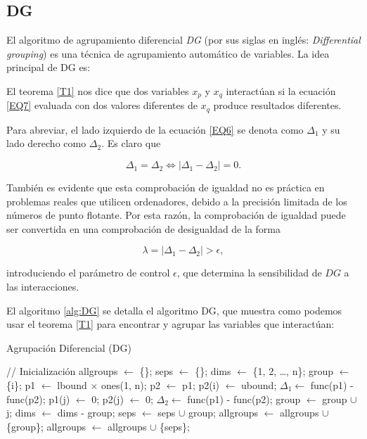 \subsection{DG}
El algoritmo de agrupamiento diferencial \textit{DG} (por sus siglas en inglés: \textit{Differential grouping}) es una técnica de agrupamiento automático de variables. La idea principal de DG es:

El teorema \ref{T1} nos dice que dos variables \(x_p\) y \(x_q\) interactúan si la ecuación \ref{EQ7} evaluada con dos valores diferentes de \(x_q\) produce resultados diferentes.

Para abreviar, el lado izquierdo de la ecuación \ref{EQ6} se denota como \(\Delta_1\) y su lado derecho como \(\Delta_2\). Es claro que 

\[
\Delta_1 = \Delta_2 \iff |\Delta_1 - \Delta_2| = 0.
\]

También es evidente que esta comprobación de igualdad no es práctica en problemas reales que utilicen ordenadores, debido a la precisión limitada de los números de punto flotante. Por esta razón, la comprobación de igualdad puede ser convertida en una comprobación de desigualdad de la forma 

\[
\lambda = |\Delta_1 - \Delta_2| > \epsilon,
\]

introduciendo el parámetro de control \(\epsilon\), que determina la sensibilidad de \(DG\) a las interacciones. 

El algoritmo \ref{alg:DG} se detalla el algoritmo DG, que muestra como podemos usar el teorema \ref{T1} para encontrar y agrupar las variables que interactúan:

\begin{algorithm}
\caption{Agrupación Diferencial (DG)}
\label{alg:DG}
\begin{algorithmic}[1]
\STATE // Inicialización
\STATE allgroups $\gets$ \{\};
\STATE seps $\gets$ \{\};
\STATE dims $\gets$ \{1, 2, \dots, n\};
    \STATE group $\gets$ \{i\};
        \STATE p1 $\gets$ lbound $\times$ ones(1, n);
        \STATE p2 $\gets$ p1;
        \STATE p2(i) $\gets$ ubound;
        \STATE $\Delta_1 \gets$ func(p1) - func(p2);
        \STATE p1(j) $\gets$ 0;
        \STATE p2(j) $\gets$ 0;
        \STATE $\Delta_2 \gets$ func(p1) - func(p2);
            \STATE group $\gets$ group $\cup$ j;
        \ENDIF
    \ENDFOR
    \STATE dims $\gets$ dims - group;
        \STATE seps $\gets$ seps $\cup$ group;
    \ELSE
        \STATE allgroups $\gets$ allgroups $\cup$ \{group\};
    \ENDIF
\ENDFOR
\STATE allgroups $\gets$ allgroups $\cup$ \{seps\};
\end{algorithmic}
\end{algorithm}

